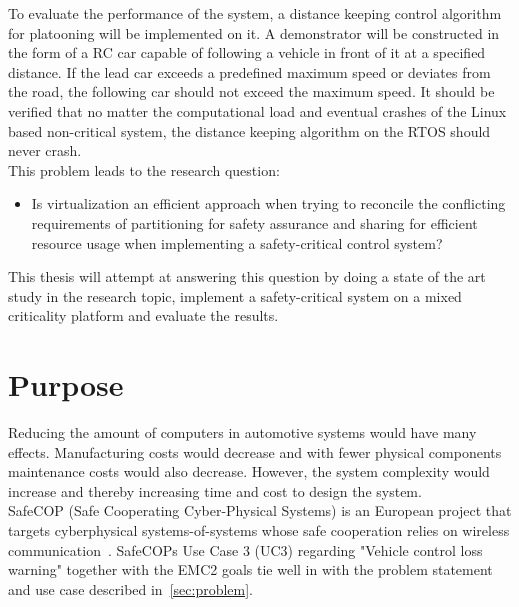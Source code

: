 To evaluate the performance of the system, a distance keeping control algorithm for platooning will be implemented on it. A demonstrator will be constructed in the form of a RC car capable of following a vehicle in front of it at a specified distance. If the lead car exceeds a predefined maximum speed or deviates from the road, the following car should not exceed the maximum speed. %
It should be verified that no matter the computational load and eventual crashes of the Linux based non-critical system, the distance keeping algorithm on the RTOS should never crash.\\ %

This problem leads to the research question: 

\begin{itemize}
\item Is virtualization an efficient approach when trying to reconcile the conflicting requirements of partitioning for safety assurance and sharing for efficient resource usage when implementing a safety-critical control system?
\end{itemize}

This thesis will attempt at answering this question by doing a state of the art study in the research topic, implement a safety-critical system on a mixed criticality platform and evaluate the results. 

\section{Purpose}
Reducing the amount of computers in automotive systems would have many effects. Manufacturing costs would decrease and with fewer physical components maintenance costs would also decrease. However, the system complexity would increase and thereby increasing time and cost to design the system. \\

SafeCOP (Safe Cooperating Cyber-Physical Systems) is an European project that targets cyberphysical systems-of-systems whose safe cooperation relies on wireless communication~\cite{safecop2016}. SafeCOPs Use Case 3 (UC3) regarding "Vehicle control loss warning" together with the EMC2 goals tie well in with the problem statement and use case described in~\ref{sec:problem}. %

